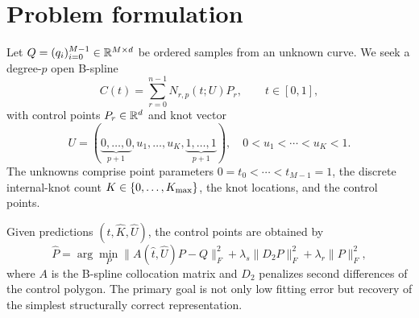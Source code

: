 \section{Problem formulation}
\label{sec:problem}

Let $Q=(q_i)_{i=0}^{M-1}\in\mathbb{R}^{M\times d}$ be ordered samples from an unknown
curve. We seek a degree-$p$ open B-spline
\begin{equation}
  C(t)=\sum_{r=0}^{n-1}N_{r,p}(t;U)P_r,
  \qquad t\in[0,1],
\end{equation}
with control points $P_r\in\mathbb{R}^d$ and knot vector
\begin{equation}
  U=(\underbrace{0,\ldots,0}_{p+1},
  u_1,\ldots,u_K,
  \underbrace{1,\ldots,1}_{p+1}),
  \quad 0<u_1<\cdots<u_K<1.
\end{equation}
The unknowns comprise point parameters
$0=t_0<\cdots<t_{M-1}=1$, the discrete internal-knot count
$K\in\{0,\ldots,K_{\max}\}$, the knot locations, and the control points.

Given predictions $(\widehat t,\widehat K,\widehat U)$, the control points are
obtained by
\begin{equation}
  \widehat P=\arg\min_P
  \|A(\widehat t,\widehat U)P-Q\|_F^2
  +\lambda_s\|D_2P\|_F^2+\lambda_r\|P\|_F^2,
  \label{eq:control_solve}
\end{equation}
where $A$ is the B-spline collocation matrix and $D_2$ penalizes second
differences of the control polygon. The primary goal is not only low fitting
error but recovery of the simplest structurally correct representation.
